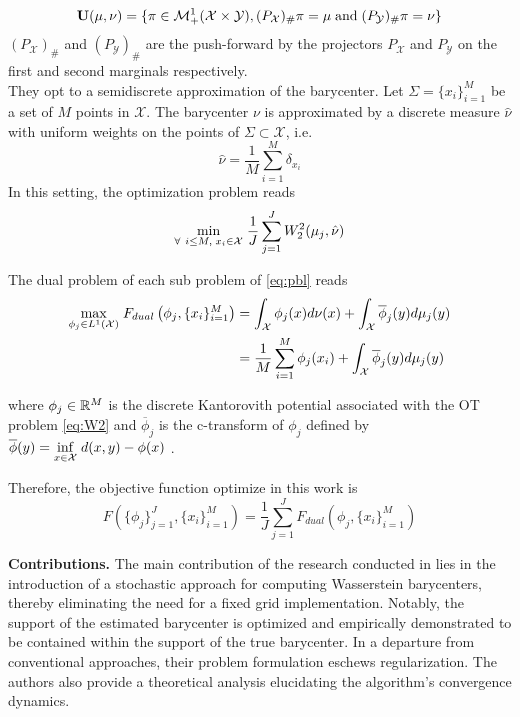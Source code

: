 $$ \textbf{U}(\mu, \nu) = \lbrace  \pi \in \mathcal{M}_+^1(\mathcal{X}\times\mathcal{Y}),  (P_\mathcal{X})_\# \pi = \mu\; \textrm{and}\; (P_\mathcal{Y} )_\# \pi = \nu  \rbrace $$
$(P_\mathcal{X} )_\#$ and $(P_\mathcal{Y} )_\#$ are the push-forward by the projectors $P_\mathcal{X}$ and $P_\mathcal{Y}$ on the first and second marginals respectively. \\

They opt to a semidiscrete approximation of the barycenter. Let $\Sigma = \lbrace x_i \rbrace_{i=1}^M$ be a set of $M$ points in $\mathcal{X}$. The barycenter $\nu$ is approximated by a discrete measure $\hat{\nu}$ with uniform weights on the points of $\Sigma\subset \mathcal{X}$, i.e.
$$ \hat{\nu} = \frac{1}{M} \sum_{i=1}^M \delta_{x_i} $$ 
In this setting, the optimization problem reads 
\begin{equation}\label{eq:pbl}
     \underset{\forall\ i \leq M,\; x_i \in \mathcal{X}}{\min}\; \frac{1}{J}\sum_{j=1}^{J} W_2^2(\mu_j, \hat{\nu})
\end{equation}

The dual problem of each sub problem of \eqref{eq:pbl} reads 
\begin{align*}
 \underset{\phi_j \in L^1(\mathcal{X})}{\max}\; F_{dual}\left(\phi_j, \lbrace x_i \rbrace_{i=1}^M\right) &= \int_{\mathcal{X}} \phi_j(x)d\nu(x) + \int_{\mathcal{X}} \overline{\phi}_j(y) d\mu_j(y) \\
 &= \frac{1}{M}\sum_{i=1}^{M} \phi_j(x_i) + \int_{\mathcal{X}} \overline{\phi}_j(y) d\mu_j(y) \\
\end{align*}

where $\phi_j\in\mathbb{R}^{M}$ is the discrete Kantorovith potential associated with the OT problem \eqref{eq:W2} and $\overline{\phi}_j$ is the c-transform of $\phi_j$ defined by
$ \overline{\phi}(y) = \underset{x \in \mathcal{X}}{\inf}\; d(x, y) - \phi(x)$ \cite{peyre_computational_2020}. 

Therefore, the objective function optimize in this work \cite{claici_stochastic_2018} is 
\begin{equation}\label{eq:obj}
     F\left(\lbrace \phi_j\rbrace_{j=1}^J, \lbrace x_i \rbrace_{i=1}^M \right) = \frac{1}{J} \sum_{j=1}^{J} F_{dual}\left(\phi_j, \lbrace x_i \rbrace_{i=1}^M \right)
\end{equation}


\textbf{Contributions.} The main contribution of the research conducted in \cite{claici_stochastic_2018} lies in the introduction of a stochastic approach for computing Wasserstein barycenters, thereby eliminating the need for a fixed grid implementation. Notably, the support of the estimated barycenter is optimized and empirically demonstrated to be contained within the support of the true barycenter.  In a departure from conventional approaches, their problem formulation eschews regularization. The authors also provide a theoretical analysis elucidating the algorithm's convergence dynamics. \\ 

